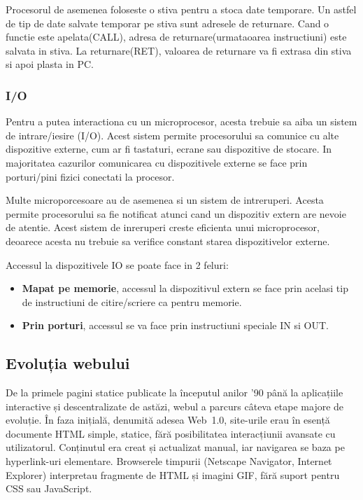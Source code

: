 \documentclass[titlepage,12pt]{article}
\begin{document}
Procesorul de asemenea foloseste o stiva pentru a stoca date temporare. Un astfel de tip de date salvate temporar pe stiva sunt adresele de returnare.
Cand o functie este apelata(CALL), adresa de returnare(urmataoarea instructiuni) este salvata in stiva. La returnare(RET), valoarea de returnare va fi extrasa din stiva si apoi plasta in PC.

\subsubsection{I/O}

Pentru a putea interactiona cu un microprocesor, acesta trebuie sa aiba un sistem de intrare/iesire (I/O).
Acest sistem permite procesorului sa comunice cu alte dispozitive externe, cum ar fi tastaturi, ecrane sau dispozitive de stocare.
In majoritatea cazurilor comunicarea cu dispozitivele externe se face prin porturi/pini fizici conectati la procesor.

Multe microporcesoare au de asemenea si un sistem de intreruperi. Acesta permite procesorului sa fie notificat atunci cand un dispozitiv extern are nevoie de atentie.
Acest sistem de inreruperi creste eficienta unui microprocesor, deoarece acesta nu trebuie sa verifice constant starea dispozitivelor externe.

Accessul la dispozitivele IO se poate face in 2 feluri:
\begin{itemize}
    \item \textbf{Mapat pe memorie}, accessul la dispozitivul extern se face prin acelasi tip de instructiuni de citire/scriere ca pentru memorie.
    \item \textbf{Prin porturi}, accessul se va face prin instructiuni speciale IN si OUT.
\end{itemize}

\subsection{Evoluția webului}

De la primele pagini statice publicate la începutul anilor ’90 până la aplicațiile interactive și descentralizate de astăzi, webul a parcurs câteva etape majore de evoluție. În faza inițială, denumită adesea Web 1.0, site-urile erau în esență documente HTML simple, statice, fără posibilitatea interacțiunii avansate cu utilizatorul. Conținutul era creat și actualizat manual, iar navigarea se baza pe hyperlink-uri elementare. Browserele timpurii (Netscape Navigator, Internet Explorer) interpretau fragmente de HTML și imagini GIF, fără suport pentru CSS sau JavaScript.
\end{document}
